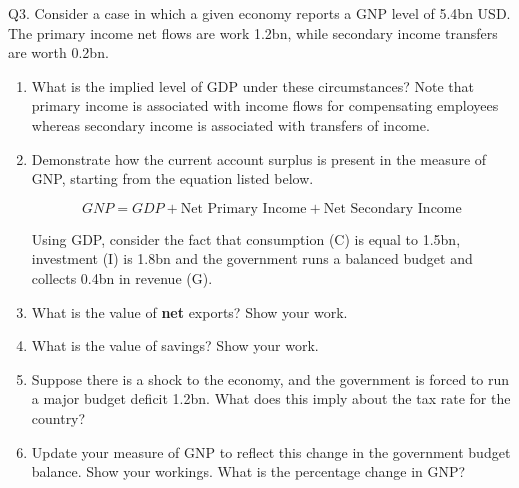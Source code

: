 \documentclass[12pt]{article}
\begin{document}
\newpage


\noindent Q3. Consider a case in which a given economy reports a GNP level of 5.4bn USD. 
The primary income net flows are work 1.2bn, while secondary income transfers are worth 0.2bn. 

\begin{enumerate}[1)]
	\item What is the implied level of GDP under these circumstances? Note that primary income is associated with income flows for compensating employees whereas secondary income is associated with transfers of income. 
	
	\vspace{3in}
	
	\item Demonstrate how the current account surplus is present in the measure of GNP, starting from the equation listed below.
	
	$$GNP = GDP + \text{Net Primary Income} + \text{Net Secondary Income}$$
	
	\vspace{1in}
	
	
	\newpage
	
	Using GDP, consider the fact that consumption (C) is equal to 1.5bn, investment (I) is 1.8bn and the government runs a balanced budget and collects 0.4bn in revenue (G). 
	
	\item What is the value of {\bf net} exports? Show your work.
	
	
	
	\vspace{1.4in}
	
	\item What is the value of savings? Show your work.
	
	\vspace{2.5in}
	
	
	\item Suppose there is a shock to the economy, and the government is forced to run a major budget deficit 1.2bn.
	What does this imply about the tax rate for the country?
	
	\vspace{2.5in}
	
	\item Update your measure of GNP to reflect this change in the government budget balance. Show your workings. What is the percentage change in GNP?
	
	\vspace{2in}
	
\end{enumerate}
\end{document}
